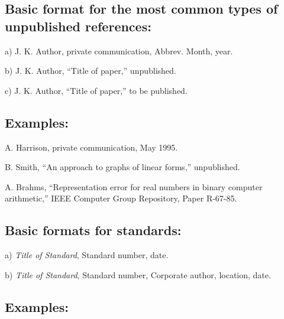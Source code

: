 \documentclass[journal]{IEEEtai}
\begin{document}
\subsection*{Basic format for the most common types of unpublished references:}\vspace*{-12pt}
\begin{thebibliography}{34}
\item[a)] J. K. Author, private communication, Abbrev. Month, year.

\item[b)] J. K. Author, ``Title of paper,'' unpublished.

\item[c)] J. K. Author, ``Title of paper,'' to be published.
\end{thebibliography}

\subsection*{Examples:}\vspace*{-18pt}

\begin{thebibliography}{34}
\setcounter{enumiv}{26}

\bibitem{}A. Harrison, private communication, May 1995.

\bibitem{}B. Smith, ``An approach to graphs of linear forms,'' unpublished.

\bibitem{}A. Brahms, ``Representation error for real numbers in binary computer arithmetic,'' IEEE Computer Group Repository, Paper R-67-85.
\end{thebibliography}\vspace*{-6pt}

\subsection*{Basic formats for standards:}\vspace*{-18pt}
\begin{thebibliography}{34}
\item[a)] {\em Title of Standard}, Standard number, date.

\item[b)] {\em Title of Standard}, Standard number, Corporate author, location, date.
\end{thebibliography}\vspace*{-6pt}

\subsection*{Examples:}\vspace*{-18pt}
\end{document}
